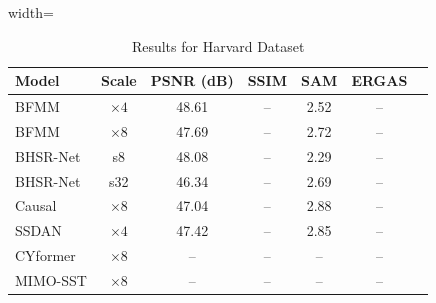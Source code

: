 \documentclass[conference]{IEEEtran}
\begin{document}
\begin{table}[htbp]
\caption{Results for Harvard Dataset \cite{harvard_dataset}}
\begin{center}
\begin{adjustbox}{width=\columnwidth}
\begin{tabular}{lcccccc}
\toprule
\textbf{Model} & \textbf{Scale} & \textbf{PSNR (dB)} & \textbf{SSIM} & \textbf{SAM} & \textbf{ERGAS} \\
\midrule
BFMM \cite{li2026bfmm} & $\times 4$ & 48.61 & -- & 2.52 & -- \\
BFMM \cite{li2026bfmm} & $\times 8$ & 47.69 & -- & 2.72 & -- \\
BHSR-Net \cite{dou2026bhsrnet} & s8 & 48.08 & -- & 2.29 & -- \\
BHSR-Net \cite{dou2026bhsrnet} & s32 & 46.34 & -- & 2.69 & -- \\
Causal \cite{liu2026causal} & $\times 8$ & 47.04 & -- & 2.88 & -- \\
SSDAN \cite{ssdan2026} & $\times 4$ & 47.42 & -- & 2.85 & -- \\
CYformer \cite{chen2025cyformer} & $\times 8$ & -- & -- & -- & -- \\
MIMO-SST \cite{fang2024mimosst} & $\times 8$ & -- & -- & -- & -- \\
\bottomrule
\end{tabular}
\end{adjustbox}
\label{tab:harvard}
\end{center}
\end{table}
\end{document}
